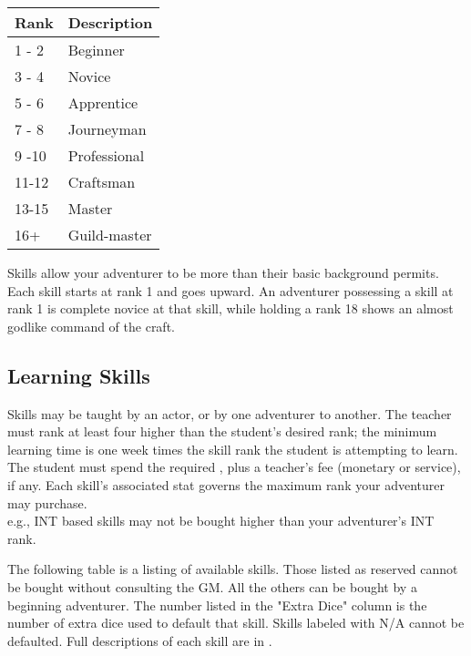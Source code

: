 \begin{normbox}

\small
\begin{tabular}{@{}l l}
\textbf{Rank} & \textbf{Description}\\
\midrule
1 - 2 & Beginner\\
3 - 4 & Novice\\
5 - 6 & Apprentice\\
7 - 8 & Journeyman\\
9 -10 & Professional\\
11-12 & Craftsman\\
13-15 & Master\\
16+ & Guild-master\\
\end{tabular}
\end{normbox}

Skills allow your adventurer to be more than their basic background permits. Each skill starts at rank 1 and goes upward. An adventurer possessing a skill at rank 1 is complete novice at that skill, while holding a rank 18 shows an almost godlike command of the craft.

\subsection{Learning Skills}
Skills may be taught by an actor, or by one adventurer to another. The teacher must rank at least four higher than the student's desired rank; the minimum learning time is one week times the skill rank the student is attempting to learn. The student must spend the required \EP, plus a teacher's fee (monetary or service), if any. Each skill's associated stat governs the maximum rank your adventurer may purchase.\\
e.g., INT based skills may not be bought higher than your adventurer's INT rank.

The following table is a listing of available skills. Those listed as reserved cannot be bought without consulting the GM. All the others can be bought by a beginning adventurer. The number listed in the "Extra Dice" column is the number of extra dice used to default that skill. Skills labeled with N/A cannot be defaulted. Full descriptions of each skill are in .
\vfill\null
\label{create-skills}

